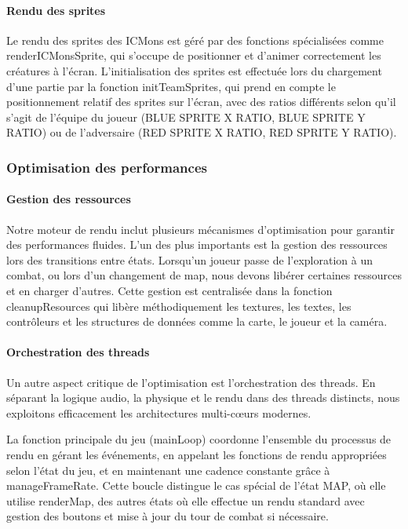 \documentclass[12pt,a4paper, twoside]{article}
\begin{document}
\paragraph{Rendu des sprites} Le rendu des sprites des ICMons est géré par des fonctions spécialisées comme renderICMonsSprite, qui s'occupe de positionner et d'animer correctement les créatures à l'écran. L'initialisation des sprites est effectuée lors du chargement d'une partie par la fonction initTeamSprites, qui prend en compte le positionnement relatif des sprites sur l'écran, avec des ratios différents selon qu'il s'agit de l'équipe du joueur (BLUE SPRITE X RATIO, BLUE SPRITE Y RATIO) ou de l'adversaire (RED SPRITE X RATIO, RED SPRITE Y RATIO).

\subsubsection{Optimisation des performances}
\paragraph{Gestion des ressources} Notre moteur de rendu inclut plusieurs mécanismes d'optimisation pour garantir des performances fluides. L'un des plus importants est la gestion des ressources lors des transitions entre états. Lorsqu'un joueur passe de l'exploration à un combat, ou lors d'un changement de map, nous devons libérer certaines ressources et en charger d'autres. Cette gestion est centralisée dans la fonction cleanupResources qui libère méthodiquement les textures, les textes, les contrôleurs et les structures de données comme la carte, le joueur et la caméra.

\paragraph{Orchestration des threads} Un autre aspect critique de l'optimisation est l'orchestration des threads. En séparant la logique audio, la physique et le rendu dans des threads distincts, nous exploitons efficacement les architectures multi-cœurs modernes.

La fonction principale du jeu (mainLoop) coordonne l'ensemble du processus de rendu en gérant les événements, en appelant les fonctions de rendu appropriées selon l'état du jeu, et en maintenant une cadence constante grâce à manageFrameRate. Cette boucle distingue le cas spécial de l'état MAP, où elle utilise renderMap, des autres états où elle effectue un rendu standard avec gestion des boutons et mise à jour du tour de combat si nécessaire.
\end{document}
